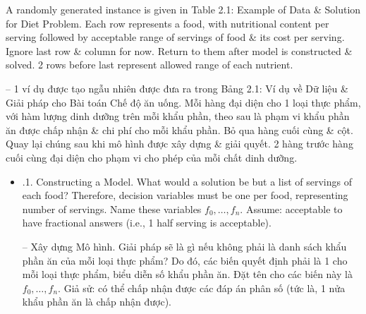 \documentclass{article}
\begin{document}
\begin{itemize}
\begin{itemize}
        A randomly generated instance is given in {\sf Table 2.1: Example of Data \& Solution for Diet Problem}. Each row represents a food, with nutritional content per serving followed by acceptable range of servings of food \& its cost per serving. Ignore last row \& column for now. Return to them after model is constructed \& solved. 2 rows before last represent allowed range of each nutrient.

        -- 1 ví dụ được tạo ngẫu nhiên được đưa ra trong {\sf Bảng 2.1: Ví dụ về Dữ liệu \& Giải pháp cho Bài toán Chế độ ăn uống}. Mỗi hàng đại diện cho 1 loại thực phẩm, với hàm lượng dinh dưỡng trên mỗi khẩu phần, theo sau là phạm vi khẩu phần ăn được chấp nhận \& chi phí cho mỗi khẩu phần. Bỏ qua hàng cuối cùng \& cột. Quay lại chúng sau khi mô hình được xây dựng \& giải quyết. 2 hàng trước hàng cuối cùng đại diện cho phạm vi cho phép của mỗi chất dinh dưỡng.
        \begin{itemize}
            \item {.1. Constructing a Model.} What would a solution be but a list of servings of each food? Therefore, decision variables must be one per food, representing number of servings. Name these variables $f_0,\ldots,f_n$. Assume: acceptable to have fractional answers (i.e., 1 half serving is acceptable).

            -- {\sf Xây dựng Mô hình.} Giải pháp sẽ là gì nếu không phải là danh sách khẩu phần ăn của mỗi loại thực phẩm? Do đó, các biến quyết định phải là 1 cho mỗi loại thực phẩm, biểu diễn số khẩu phần ăn. Đặt tên cho các biến này là $f_0,\ldots,f_n$. Giả sử: có thể chấp nhận được các đáp án phân số (tức là, 1 nửa khẩu phần ăn là chấp nhận được).


\end{itemize}
\end{itemize}
\end{itemize}
\end{document}
